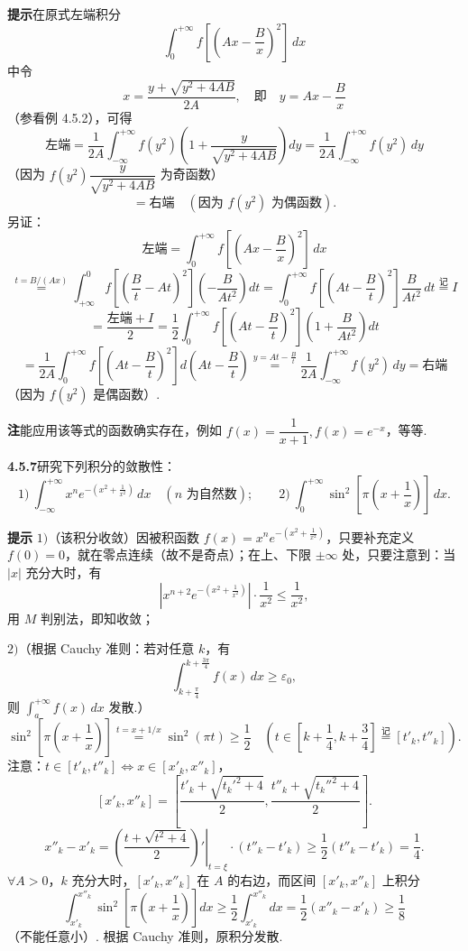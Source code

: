 \documentclass[UTF8,12pt,a4paper,fontset=fandol]{ctexart}
\begin{document}
\noindent\textbf{提示}\quad 在原式左端积分
\[
\int_0^{+\infty}f\left[\left(Ax-\frac Bx\right)^2\right]\,dx
\]
中令
\[
x=\frac{y+\sqrt{y^2+4AB}}{2A},
\quad\text{即}\quad y=Ax-\frac Bx
\]
（参看例 4.5.2），可得
\[
\text{左端}=\frac1{2A}\int_{-\infty}^{+\infty}f(y^2)\left(1+\frac y{\sqrt{y^2+4AB}}\right)dy
=\frac1{2A}\int_{-\infty}^{+\infty}f(y^2)\,dy
\]
（因为 $f(y^2)\dfrac y{\sqrt{y^2+4AB}}$ 为奇函数）
\[
=\text{右端}\quad(\text{因为 }f(y^2)\text{ 为偶函数}).
\]
另证：
\[
\text{左端}=\int_0^{+\infty}f\left[\left(Ax-\frac Bx\right)^2\right]\,dx
\]
\[
\stackrel{t=B/(Ax)}{=}\int_{+\infty}^0
f\left[\left(\frac Bt-At\right)^2\right]\left(-\frac B{At^2}\right)dt
=\int_0^{+\infty}f\left[\left(At-\frac Bt\right)^2\right]\frac B{At^2}\,dt\stackrel{\text{记}}{=}I
\]
\[
=\frac{\text{左端}+I}{2}
=\frac12\int_0^{+\infty}f\left[\left(At-\frac Bt\right)^2\right]\left(1+\frac B{At^2}\right)dt
\]
\[
=\frac1{2A}\int_0^{+\infty}f\left[\left(At-\frac Bt\right)^2\right]d\left(At-\frac Bt\right)
\stackrel{y=At-\frac Bt}{=}\frac1{2A}\int_{-\infty}^{+\infty}f(y^2)\,dy
=\text{右端}
\]
（因为 $f(y^2)$ 是偶函数）.

\noindent\textbf{注}\quad 能应用该等式的函数确实存在，例如 $f(x)=\dfrac1{x+1}, f(x)=e^{-x}$，等等.

\noindent\textbf{4.5.7}\quad 研究下列积分的敛散性：
\[
1)\ \int_{-\infty}^{+\infty}x^ne^{-\left(x^2+\frac1{x^2}\right)}\,dx\quad(n\text{ 为自然数});
\qquad
2)\ \int_0^{+\infty}\sin^2\left[\pi\left(x+\frac1x\right)\right]\,dx.
\]

\noindent\textbf{提示}\quad
$1)$（该积分收敛）因被积函数 $f(x)=x^ne^{-\left(x^2+\frac1{x^2}\right)}$，只要补充定义 $f(0)=0$，就在零点连续（故不是奇点）；在上、下限 $\pm\infty$ 处，只要注意到：当 $|x|$ 充分大时，有
\[
\left|x^{n+2}e^{-\left(x^2+\frac1{x^2}\right)}\right|\cdot\frac1{x^2}\le\frac1{x^2},
\]
用 $M$ 判别法，即知收敛；

$2)$（根据 Cauchy 准则：若对任意 $k$，有
\[
\int_{k+\frac\pi4}^{k+\frac{3\pi}4}f(x)\,dx\ge\varepsilon_0,
\]
则 $\displaystyle\int_a^{+\infty}f(x)\,dx$ 发散.）
\[
\sin^2\left[\pi\left(x+\frac1x\right)\right]\stackrel{t=x+1/x}{=}\sin^2(\pi t)\ge\frac12
\quad\left(t\in\left[k+\frac14,k+\frac34\right]\stackrel{\text{记}}{=}[t'_k,t''_k]\right).
\]
注意：$t\in[t'_k,t''_k]\Longleftrightarrow x\in[x'_k,x''_k]$，
\[
[x'_k,x''_k]=\left[\frac{t'_k+\sqrt{t_k'^2+4}}2,\frac{t''_k+\sqrt{t_k''^2+4}}2\right].
\]
\[
x''_k-x'_k
=\left.\left(\frac{t+\sqrt{t^2+4}}2\right)'\right|_{t=\xi}\cdot(t''_k-t'_k)
\ge\frac12(t''_k-t'_k)=\frac14.
\]
$\forall A>0$，$k$ 充分大时，$[x'_k,x''_k]$ 在 $A$ 的右边，而区间 $[x'_k,x''_k]$ 上积分
\[
\int_{x'_k}^{x''_k}\sin^2\left[\pi\left(x+\frac1x\right)\right]dx
\ge\frac12\int_{x'_k}^{x''_k}dx
=\frac12(x''_k-x'_k)\ge\frac18
\]
（不能任意小）. 根据 Cauchy 准则，原积分发散.
\end{document}
